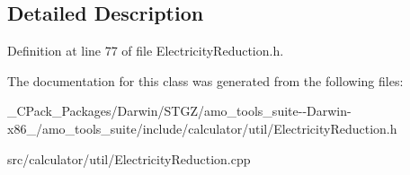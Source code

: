 \subsection{Detailed Description}


Definition at line 77 of file Electricity\+Reduction.\+h.



The documentation for this class was generated from the following files\+:\begin{DoxyCompactItemize}
\item 
\+\_\+\+C\+Pack\+\_\+\+Packages/\+Darwin/\+S\+T\+G\+Z/amo\+\_\+tools\+\_\+suite-\/-\/\+Darwin-\/x86\+\_/amo\+\_\+tools\+\_\+suite/include/calculator/util/Electricity\+Reduction.\+h\item 
src/calculator/util/Electricity\+Reduction.\+cpp\end{DoxyCompactItemize}
